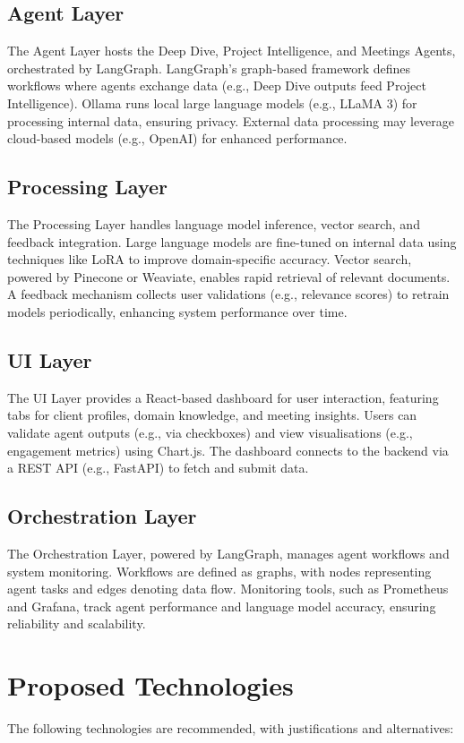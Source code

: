 \documentclass{article}
\begin{document}
\subsection{Agent Layer}
The Agent Layer hosts the Deep Dive, Project Intelligence, and Meetings Agents, orchestrated by LangGraph. LangGraph’s graph-based framework defines workflows where agents exchange data (e.g., Deep Dive outputs feed Project Intelligence). Ollama runs local large language models (e.g., LLaMA 3) for processing internal data, ensuring privacy. External data processing may leverage cloud-based models (e.g., OpenAI) for enhanced performance.

\subsection{Processing Layer}
The Processing Layer handles language model inference, vector search, and feedback integration. Large language models are fine-tuned on internal data using techniques like LoRA to improve domain-specific accuracy. Vector search, powered by Pinecone or Weaviate, enables rapid retrieval of relevant documents. A feedback mechanism collects user validations (e.g., relevance scores) to retrain models periodically, enhancing system performance over time.

\subsection{UI Layer}
The UI Layer provides a React-based dashboard for user interaction, featuring tabs for client profiles, domain knowledge, and meeting insights. Users can validate agent outputs (e.g., via checkboxes) and view visualisations (e.g., engagement metrics) using Chart.js. The dashboard connects to the backend via a REST API (e.g., FastAPI) to fetch and submit data.

\subsection{Orchestration Layer}
The Orchestration Layer, powered by LangGraph, manages agent workflows and system monitoring. Workflows are defined as graphs, with nodes representing agent tasks and edges denoting data flow. Monitoring tools, such as Prometheus and Grafana, track agent performance and language model accuracy, ensuring reliability and scalability.

\section{Proposed Technologies}
The following technologies are recommended, with justifications and alternatives:
\end{document}
